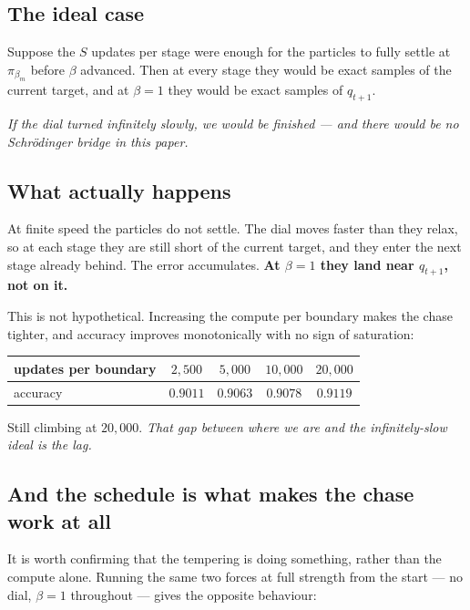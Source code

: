 \documentclass[11pt]{article}
\theoremstyle{definition}
\theoremstyle{plain}
\theoremstyle{remark}
\begin{document}
\subsection{The ideal case}

Suppose the $S$ updates per stage were enough for the particles to fully settle
at $\pi_{\beta_m}$ before $\beta$ advanced. Then at every stage they would be
exact samples of the current target, and at $\beta = 1$ they would be exact
samples of $q_{t+1}$.

\begin{center}
\emph{If the dial turned infinitely slowly, we would be finished --- and there
would be no Schr\"odinger bridge in this paper.}
\end{center}

\subsection{What actually happens}

At finite speed the particles do not settle. The dial moves faster than they
relax, so at each stage they are still short of the current target, and they
enter the next stage already behind. The error accumulates. \textbf{At
$\beta = 1$ they land near $q_{t+1}$, not on it.}

This is not hypothetical. Increasing the compute per boundary makes the chase
tighter, and accuracy improves monotonically with no sign of saturation:

\begin{center}
\begin{tabular}{lcccc}
\toprule
updates per boundary & $2{,}500$ & $5{,}000$ & $10{,}000$ & $20{,}000$ \\
\midrule
accuracy & $0.9011$ & $0.9063$ & $0.9078$ & $0.9119$ \\
\bottomrule
\end{tabular}
\end{center}

Still climbing at $20{,}000$. \emph{That gap between where we are and the
infinitely-slow ideal is the lag.}

\subsection{And the schedule is what makes the chase work at all}

It is worth confirming that the tempering is doing something, rather than the
compute alone. Running the same two forces at full strength from the start ---
no dial, $\beta = 1$ throughout --- gives the opposite behaviour:
\end{document}
